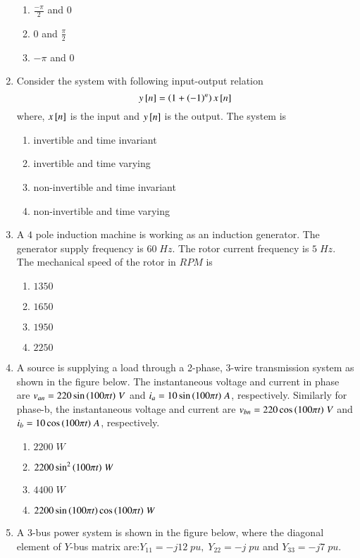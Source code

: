 \documentclass[journal,12pt,onecolumn]{IEEEtran}
\theoremstyle{remark}
\begin{document}
\begin{enumerate}
\begin{enumerate}
    \item $\frac{-\pi}{2}$ and $0$
    \item $0$ and $\frac{\pi}{2}$
    \item $-\pi$ and $0$
\end{enumerate}
\item Consider the system with following input-output relation $$y{}\left[n\right]=\left(1+\left(-1\right)^n\right)x{}\left[n\right]$$ where, $x{}\left[n\right]$ is the input and $y{}\left[n\right]$ is the output. The system is
\begin{enumerate}
    \item invertible and time invariant 
    \item invertible and time varying
    \item non-invertible and time invariant
    \item non-invertible and time varying
\end{enumerate}
\item A $4$ pole induction machine is working as an induction generator. The generator supply frequency is $60\;Hz$. The rotor current frequency is $5\;Hz$. The mechanical speed of the rotor in $RPM$ is
\begin{enumerate}
    \item $1350$
    \item $1650$
    \item $1950$
    \item $2250$
\end{enumerate}
\item A source is supplying a load through a 2-phase, 3-wire transmission system as shown in the figure below. The instantaneous voltage and current in phase are $v_{an}=220\sin{\ensuremath{\left(100\pi t\right)}}\;V$ and $i_a=10\sin{\ensuremath{\left(100\pi t\right)}}\;A$, respectively. Similarly for phase-b, the instantaneous voltage and current are $v_{bn}=220\cos{\ensuremath{\left(100\pi t\right)}}\;V$ and $i_b=10\cos{\ensuremath{\left(100\pi t\right)}}\;A$, respectively.
	
	\begin{enumerate}
    \item $2200\;W$
    \item $2200\sin^2{\left(100\pi t\right)}\;W$
    \item $4400\;W$
    \item $2200\sin{\ensuremath{\left(100\pi t\right)}}\cos{\ensuremath{\left(100\pi t\right)}}\;W$
\end{enumerate}
\item A 3-bus power system is shown in the figure below, where the diagonal element of $Y$-bus matrix are:$Y_{11}=-j12\;pu,\;Y_{22}=-j\;pu$ and $Y_{33}=-j7\;pu$.\\

\end{enumerate}
\end{document}

